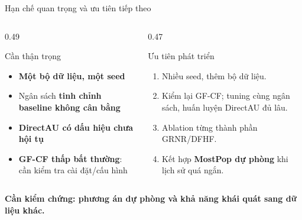 \begin{frame}{Hạn chế quan trọng và ưu tiên tiếp theo}
\small

\begin{columns}[T,onlytextwidth]

    \begin{column}{0.49\textwidth}
        \begin{block}{Cần thận trọng}
            \begin{itemize}\setlength\itemsep{6pt}
            \item \textbf{Một bộ dữ liệu, một seed}
            \item Ngân sách \textbf{tinh chỉnh baseline không cân bằng}
            \item \textbf{DirectAU có dấu hiệu chưa hội tụ}
            \item \textbf{GF-CF thấp bất thường}: cần kiểm tra cài đặt/cấu hình
            \end{itemize}
        \end{block}
    \end{column}

    \hfill

    \begin{column}{0.47\textwidth}
        \begin{block}{Ưu tiên phát triển}
            \begin{enumerate}\setlength\itemsep{6pt}
            \item Nhiều seed, thêm bộ dữ liệu.
            \item Kiểm lại GF-CF; tuning cùng ngân sách, huấn luyện DirectAU đủ lâu.
            \item Ablation từng thành phần GRNR/DFHF.
            \item Kết hợp \textbf{MostPop dự phòng} khi lịch sử quá ngắn.
            
            \end{enumerate}
        \end{block}
    \end{column}

\end{columns}


\vspace{0.18cm}
\vspace{0.18cm}
\begin{center}
\begin{minipage}{0.91\textwidth}
\centering\footnotesize\bfseries\color{PrimaryBlue}
Cần kiểm chứng: phương án dự phòng và khả năng khái quát sang dữ liệu khác.
\end{minipage}
\end{center}
\end{frame}

